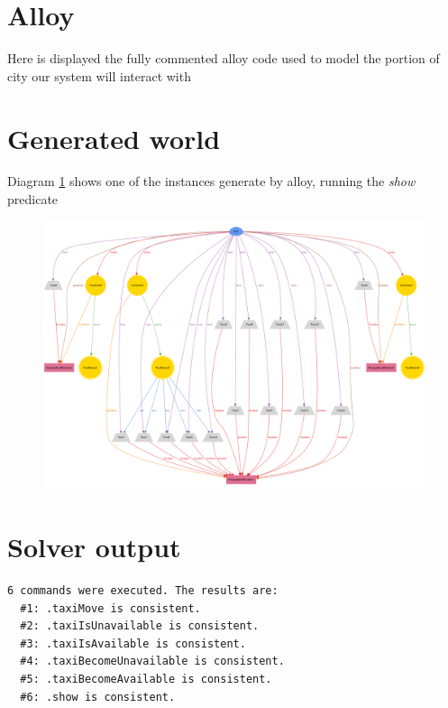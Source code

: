 \section{Alloy}

Here is displayed the fully commented alloy code used to model the portion of city
our system will interact with



\section{Generated world}

Diagram \ref{fig:generated_world} shows one of the instances generate by alloy, running the \textit{show} predicate

\begin{figure}
  \includegraphics [scale=0.3]{../../alloy/generated_world.png}
  \caption{\label{fig:generated_world}}
\end{figure}

\section{Solver output}

\begin{lstlisting}
6 commands were executed. The results are:
  #1: .taxiMove is consistent.
  #2: .taxiIsUnavailable is consistent.
  #3: .taxiIsAvailable is consistent.
  #4: .taxiBecomeUnavailable is consistent.
  #5: .taxiBecomeAvailable is consistent.
  #6: .show is consistent.
\end{lstlisting}
